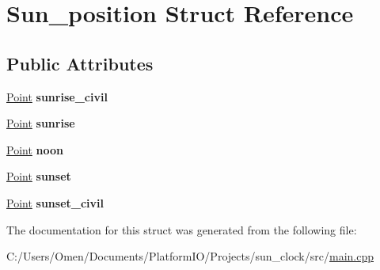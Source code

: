 \hypertarget{struct_sun__position}{}\section{Sun\+\_\+position Struct Reference}
\label{struct_sun__position}
\subsection*{Public Attributes}
\begin{DoxyCompactItemize}
\item 
\mbox{\label{struct_sun__position_ac3415c8712d85e09c6d4a33c50b2e44f}} 
\hyperlink{struct_point}{Point} {\bfseries sunrise\+\_\+civil}
\item 
\mbox{\label{struct_sun__position_aa6a8d9f0b0d134d3aa5db28e248507bb}} 
\hyperlink{struct_point}{Point} {\bfseries sunrise}
\item 
\mbox{\label{struct_sun__position_acae69e75cd8f604c3246bf767ac5d513}} 
\hyperlink{struct_point}{Point} {\bfseries noon}
\item 
\mbox{\label{struct_sun__position_a9f7fd0819b5a9bb0cb991908cb4515a0}} 
\hyperlink{struct_point}{Point} {\bfseries sunset}
\item 
\mbox{\label{struct_sun__position_a6493b242dcc1deaf10a0f91ac5ff07cd}} 
\hyperlink{struct_point}{Point} {\bfseries sunset\+\_\+civil}
\end{DoxyCompactItemize}


The documentation for this struct was generated from the following file\+:\begin{DoxyCompactItemize}
\item 
C\+:/\+Users/\+Omen/\+Documents/\+Platform\+I\+O/\+Projects/sun\+\_\+clock/src/\hyperlink{main_8cpp}{main.\+cpp}\end{DoxyCompactItemize}
